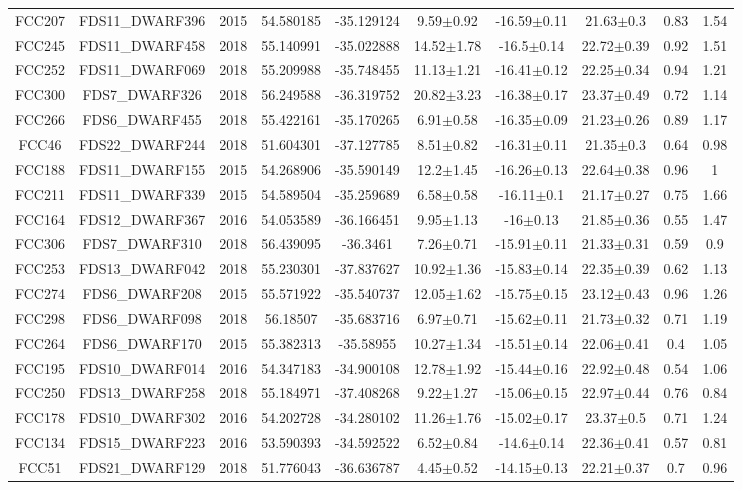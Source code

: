 \documentclass{aa}
\begin{document}
\begin{table}
\begin{center}
{{\begin{tabular}{|cccccccccc|}
FCC207 & FDS11\_DWARF396 & 2015 & 54.580185 & -35.129124 & 9.59$\pm$0.92 & -16.59$\pm$0.11 & 21.63$\pm$0.3 & 0.83 & 1.54 \\
FCC245 & FDS11\_DWARF458 & 2018 & 55.140991 & -35.022888 & 14.52$\pm$1.78 & -16.5$\pm$0.14 & 22.72$\pm$0.39 & 0.92 & 1.51 \\
FCC252 & FDS11\_DWARF069 & 2018 & 55.209988 & -35.748455 & 11.13$\pm$1.21 & -16.41$\pm$0.12 & 22.25$\pm$0.34 & 0.94 & 1.21 \\
FCC300 & FDS7\_DWARF326 & 2018 & 56.249588 & -36.319752 & 20.82$\pm$3.23 & -16.38$\pm$0.17 & 23.37$\pm$0.49 & 0.72 & 1.14 \\
FCC266 & FDS6\_DWARF455 & 2018 & 55.422161 & -35.170265 & 6.91$\pm$0.58 & -16.35$\pm$0.09 & 21.23$\pm$0.26 & 0.89 & 1.17 \\
FCC46 & FDS22\_DWARF244 & 2018 & 51.604301 & -37.127785 & 8.51$\pm$0.82 & -16.31$\pm$0.11 & 21.35$\pm$0.3 & 0.64 & 0.98 \\
FCC188 & FDS11\_DWARF155 & 2015 & 54.268906 & -35.590149 & 12.2$\pm$1.45 & -16.26$\pm$0.13 & 22.64$\pm$0.38 & 0.96 & 1 \\
FCC211 & FDS11\_DWARF339 & 2015 & 54.589504 & -35.259689 & 6.58$\pm$0.58 & -16.11$\pm$0.1 & 21.17$\pm$0.27 & 0.75 & 1.66 \\
FCC164 & FDS12\_DWARF367 & 2016 & 54.053589 & -36.166451 & 9.95$\pm$1.13 & -16$\pm$0.13 & 21.85$\pm$0.36 & 0.55 & 1.47 \\
FCC306 & FDS7\_DWARF310 & 2018 & 56.439095 & -36.3461 & 7.26$\pm$0.71 & -15.91$\pm$0.11 & 21.33$\pm$0.31 & 0.59 & 0.9 \\
FCC253 & FDS13\_DWARF042 & 2018 & 55.230301 & -37.837627 & 10.92$\pm$1.36 & -15.83$\pm$0.14 & 22.35$\pm$0.39 & 0.62 & 1.13 \\
FCC274 & FDS6\_DWARF208 & 2015 & 55.571922 & -35.540737 & 12.05$\pm$1.62 & -15.75$\pm$0.15 & 23.12$\pm$0.43 & 0.96 & 1.26 \\
FCC298 & FDS6\_DWARF098 & 2018 & 56.18507 & -35.683716 & 6.97$\pm$0.71 & -15.62$\pm$0.11 & 21.73$\pm$0.32 & 0.71 & 1.19 \\
FCC264 & FDS6\_DWARF170 & 2015 & 55.382313 & -35.58955 & 10.27$\pm$1.34 & -15.51$\pm$0.14 & 22.06$\pm$0.41 & 0.4 & 1.05 \\
FCC195 & FDS10\_DWARF014 & 2016 & 54.347183 & -34.900108 & 12.78$\pm$1.92 & -15.44$\pm$0.16 & 22.92$\pm$0.48 & 0.54 & 1.06 \\
FCC250 & FDS13\_DWARF258 & 2018 & 55.184971 & -37.408268 & 9.22$\pm$1.27 & -15.06$\pm$0.15 & 22.97$\pm$0.44 & 0.76 & 0.84 \\
FCC178 & FDS10\_DWARF302 & 2016 & 54.202728 & -34.280102 & 11.26$\pm$1.76 & -15.02$\pm$0.17 & 23.37$\pm$0.5 & 0.71 & 1.24 \\
FCC134 & FDS15\_DWARF223 & 2016 & 53.590393 & -34.592522 & 6.52$\pm$0.84 & -14.6$\pm$0.14 & 22.36$\pm$0.41 & 0.57 & 0.81 \\
FCC51 & FDS21\_DWARF129 & 2018 & 51.776043 & -36.636787 & 4.45$\pm$0.52 & -14.15$\pm$0.13 & 22.21$\pm$0.37 & 0.7 & 0.96 \\ 
\hline
\end{tabular}
}}
\end{center}
\end{table}
\end{document}
